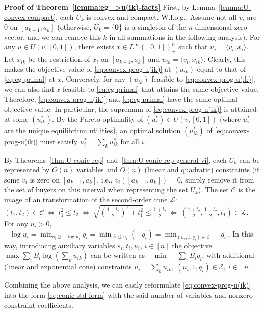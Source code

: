 \smallskip\noindent\textbf{Proof of Theorem~\ref{lemma:eg=>u(ik)-facts}}
First, by Lemma~\ref{lemma:U-convex-compact}, each $U_k$ is convex and compact. W.l.o.g., Assume not all $v_i$ are $0$ on $[a_{k-1}, a_k]$ (otherwise, $U_k = \{\mathbf{0}\}$ is a singleton of the $n$-dimensional zero vector, and we can remove this $k$ in all summations in the following analysis).
For any $u\in U(v, [0,1])$, there exists $x\in L^\infty([0,1])_+^n$ such that $u_i = \langle v_i, x_i\rangle$.  Let $x_{ik}$ be the restriction of $x_i$ on $[a_{k-1}, a_k]$ and $u_{ik} = \langle v_i, x_{ik}\rangle$. 
Clearly, this makes the objective value of \eqref{eq:convex-prog-u(ik)} at $(u_{ik})$ equal to that of \eqref{eq:eg-primal} at $x$. Conversely, for any $(u_{ik})$ feasible to \eqref{eq:convex-prog-u(ik)}, we can also find $x$ feasible to \eqref{eq:eg-primal} that attains the same objective value. Therefore, \eqref{eq:convex-prog-u(ik)} and \eqref{eq:eg-primal} have the same optimal objective value. 
In particular, the supremum of \eqref{eq:convex-prog-u(ik)} is attained at some $(u^*_{ik})$. 
By the Pareto optimality of $(u^*_i) \in U(v, [0,1])$ (where $u^*_i$ are the unique equilibrium utilities), an optimal solution $(u^*_{ik})$ of \eqref{eq:convex-prog-u(ik)} must satisfy $u^*_i = \sum_k u^*_{ik}$ for all $i$.

By Theorems~\ref{thm:U-conic-rep} and~\ref{thm:U-conic-rep-general-vi}, each $U_k$ can be represented by $O(n)$ variables and $O(n)$ (linear and quadratic) constraints (if some $v_i$ is zero on $[a_{k-1}, a_k]$, i.e., $v_i([a_{k-1}, a_k]) = 0$, simply remove it from the set of buyers on this interval when representing the set $U_k$). 
The set $\mathcal{C}$ is the image of an transformation of the second-order cone $\mathcal{L}$:
$(t_1, t_2) \in \mathcal{C} \ \Leftrightarrow \ t_1^2 \leq t_2 \ \Leftrightarrow \ \sqrt{\left(\frac{1-t_2}{2}\right)^2 + t_1^2} \leq \frac{1+t_2}{2} \ \Leftrightarrow \ \left( \frac{1+t_2}{2}, \frac{1-t_2}{2}, t_1 \right) \in \mathcal{L}$.
For any $u_i>0$,
	$- \log u_i = \min_{q_i\geq -\log u_i} q_i = \min_{e^{q_i} \leq u_i} (-q_i) = \min_{ (u_i, 1, q_i) \in \mathcal{E}} -q_i. \label{eq:log(ui)=>min(-qi)}$.
In this way, introducing auxiliary variables $s_i, t_i, u_i$, $i\in [n]$ the objective $\max \sum_i B_i \log \left( \sum_k u_{ik} \right)$ can be written as $-\min - \sum_i B_i q_i$, with additional (linear and exponential cone) constraints $u_i = \sum_k u_{ik}, \ 
(u_i, 1, q_i)\in \mathcal{E},\ i\in [n]$.

Combining the above analysis, we can easily reformulate \eqref{eq:convex-prog-u(ik)} into the form \eqref{eq:conic-std-form} with the said number of variables and nonzero constraint coefficients.

